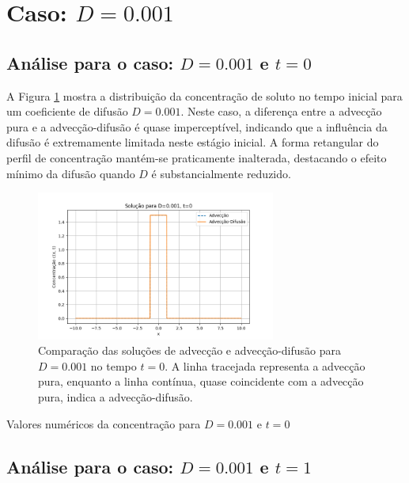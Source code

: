 \section*{Caso: \( D = 0.001 \)}


\subsection*{Análise para o caso: \( D = 0.001 \) e \( t = 0 \)}

A Figura \ref{fig:advec_diffus_0.001_t0} mostra a distribuição da concentração de soluto no tempo inicial para um coeficiente de difusão \( D = 0.001 \). Neste caso, a diferença entre a advecção pura e a advecção-difusão é quase imperceptível, indicando que a influência da difusão é extremamente limitada neste estágio inicial. A forma retangular do perfil de concentração mantém-se praticamente inalterada, destacando o efeito mínimo da difusão quando \( D \) é substancialmente reduzido.

\begin{figure}[H]
    \centering
    \includegraphics[width=0.7\textwidth]{code/plot/Advec_Difus_t0_D0.001.png}
    \caption{Comparação das soluções de advecção e advecção-difusão para \( D = 0.001 \) no tempo \( t = 0 \). A linha tracejada representa a advecção pura, enquanto a linha contínua, quase coincidente com a advecção pura, indica a advecção-difusão.}
    \label{fig:advec_diffus_0.001_t0}
\end{figure}

\begin{table}[H]
    \centering
    \caption{Valores numéricos da concentração para \( D = 0.001 \) e \( t = 0 \)}
    
\end{table}

\subsection*{Análise para o caso: \( D = 0.001 \) e \( t = 1 \)}

